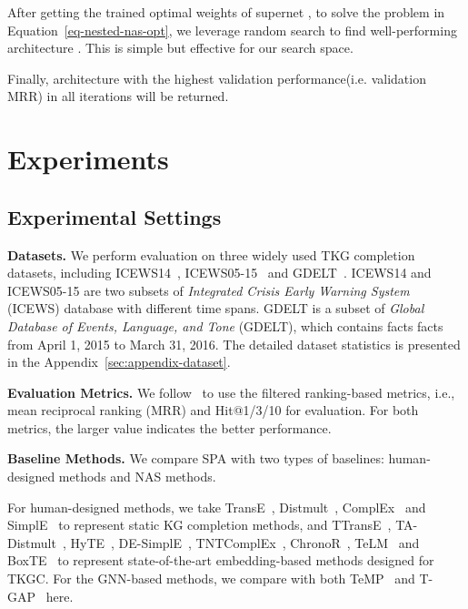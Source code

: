 \documentclass[11pt]{article}
\begin{document}
 After getting the trained optimal weights of supernet , 
to solve the problem in Equation~\eqref{eq-nested-nas-opt}, 
we leverage random search to find well-performing architecture . 
This is simple but effective for our search space. 

Finally, 
architecture with the highest validation performance(i.e. validation MRR) in all iterations will be returned. 

\section{Experiments}

\subsection{Experimental Settings}

\noindent\textbf{Datasets.} We perform evaluation on three widely used TKG completion datasets, including ICEWS14~\citep{garcia-duran-etal-2018-learning}, ICEWS05-15~\citep{garcia-duran-etal-2018-learning} and GDELT~\citep{leetaru2013gdelt}.
ICEWS14 and ICEWS05-15 are two subsets of \textit{Integrated Crisis Early Warning System} (ICEWS) database with different time spans.
GDELT is a subset of \textit{Global Database of Events, Language, and Tone} (GDELT), 
which contains facts facts from April 1, 2015 to March 31, 2016.
The detailed dataset statistics is presented in the Appendix~\ref{sec:appendix-dataset}.

\noindent\textbf{Evaluation Metrics.} We follow~\citep{bordes2013translating} to use the filtered ranking-based metrics, i.e., mean reciprocal ranking (MRR) and Hit@1/3/10 for evaluation.
For both metrics, 
the larger value indicates the better performance.

\noindent\textbf{Baseline Methods.} We compare SPA with two types of baselines: human-designed methods and NAS methods. 

For human-designed methods, 
we take TransE~\citep{bordes2013translating}, 
Distmult~\citep{yang2015embedding}, 
ComplEx~\citep{trouillon2016complex} and SimplE~\citep{kazemi2018simple} to represent static KG completion methods, and TTransE~\citep{leblay2018deriving}, 
TA-Distmult~\citep{garcia-duran-etal-2018-learning}, 
HyTE~\citep{dasgupta-etal-2018-hyte}, 
DE-SimplE~\citep{goel2020diachronic}, 
TNTComplEx~\citep{lacroix2020tensor}, 
ChronoR~\cite{sadeghian2021chronor}, 
TeLM~\citep{xu2021temporal} and
BoxTE~\citep{messner2022temporal} to represent state-of-the-art embedding-based methods designed for TKGC.
For the GNN-based methods, 
we compare with both TeMP~\citep{wu-etal-2020-temp} and T-GAP~\citep{jung2021learning} here.
\end{document}
